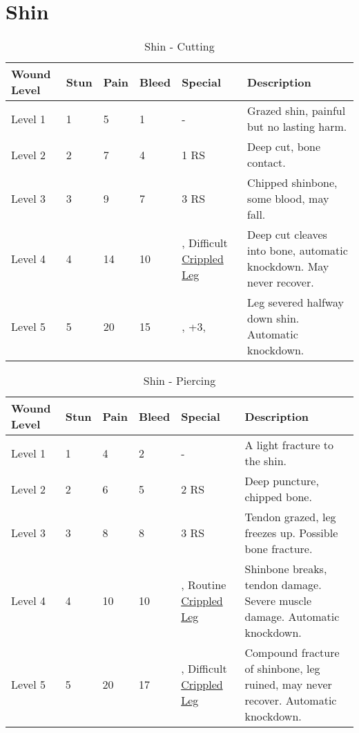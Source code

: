 \documentclass[oneside,11pt,english]{book}
\begin{document}
\section{Shin} \vspace{-25pt} \label{sec:shin}
\begin{table}[hb] %
	\caption{Shin - Cutting}
	\label{wound:Shin - Cutting}
	\begin{tabu} to 
Wound Level &Stun &Pain &Bleed &Special &Description\\\toprule
Level 1& 1& 5& 1& - &Grazed shin, painful but no lasting harm.\\
Level 2& 2& 7& 4&  1 RS &Deep cut, bone contact.\\
Level 3& 3& 9& 7&  3 RS &Chipped shinbone, some blood, may fall.\\
Level 4& 4& 14& 10& , \newline
Difficult~ \hyperref[bane:Crippled Limb/Appendage]{Crippled Leg} &Deep cut cleaves into bone, automatic knockdown. May never recover.\\
Level 5& 5& 20& 15& , \newline
{} +3, \newline
{} &Leg severed halfway down shin. Automatic knockdown.\\
	\end{tabu}
\end{table}

\begin{table}[hb] %
	\caption{Shin - Piercing}
	\label{wound:Shin - Piercing}
	\begin{tabu} to 
Wound Level &Stun &Pain &Bleed &Special &Description\\\toprule
Level 1& 1& 4& 2& - &A light fracture to the shin.\\
Level 2& 2& 6& 5&  2 RS &Deep puncture, chipped bone.\\
Level 3& 3& 8& 8&  3 RS &Tendon grazed, leg freezes up. Possible bone fracture.\\
Level 4& 4& 10& 10& , \newline
	Routine~ \hyperref[bane:Crippled Limb/Appendage]{Crippled Leg} &Shinbone breaks, tendon damage. Severe muscle damage. Automatic knockdown.\\
Level 5& 5& 20& 17& , \newline
Difficult~ \hyperref[bane:Crippled Limb/Appendage]{Crippled Leg} &Compound fracture of shinbone, leg ruined, may never recover. Automatic knockdown.\\
	\end{tabu}
\end{table}
\end{document}
